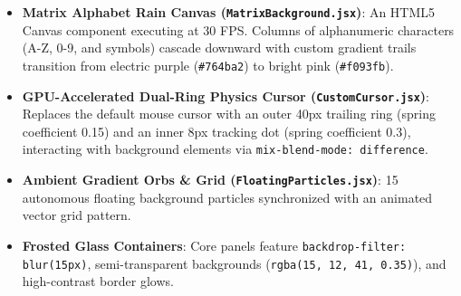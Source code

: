 \documentclass[11pt,a4paper]{article}
\begin{document}
\begin{itemize}[leftmargin=*]
    \item \textbf{Matrix Alphabet Rain Canvas (\texttt{MatrixBackground.jsx})}: An HTML5 Canvas component executing at 30 FPS. Columns of alphanumeric characters (A-Z, 0-9, and symbols) cascade downward with custom gradient trails transition from electric purple (\texttt{\#764ba2}) to bright pink (\texttt{\#f093fb}).
    \item \textbf{GPU-Accelerated Dual-Ring Physics Cursor (\texttt{CustomCursor.jsx})}: Replaces the default mouse cursor with an outer 40px trailing ring (spring coefficient 0.15) and an inner 8px tracking dot (spring coefficient 0.3), interacting with background elements via \texttt{mix-blend-mode: difference}.
    \item \textbf{Ambient Gradient Orbs \& Grid (\texttt{FloatingParticles.jsx})}: 15 autonomous floating background particles synchronized with an animated vector grid pattern.
    \item \textbf{Frosted Glass Containers}: Core panels feature \texttt{backdrop-filter: blur(15px)}, semi-transparent backgrounds (\texttt{rgba(15, 12, 41, 0.35)}), and high-contrast border glows.
\end{itemize}
\end{document}
